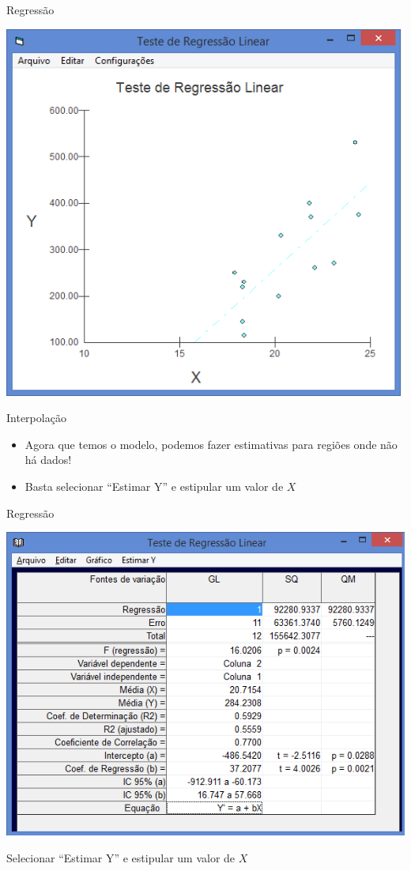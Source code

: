 \documentclass{beamer}
\begin{document}
\begin{frame}{Regressão}
  \begin{center}
    \includegraphics[height=0.9\textheight]{grafico_regressao}
  \end{center}
\end{frame}

\begin{frame}{Interpolação}
  \begin{itemize}
  \item Agora que temos o modelo, podemos fazer estimativas
    para regiões onde não há dados!
  \item Basta selecionar ``Estimar Y'' e estipular um valor de $X$
  \end{itemize}
\end{frame}

\begin{frame}{Regressão}
  \begin{center}
    \includegraphics[height=0.7\textheight]{resultado_regressao}
  \end{center}

Selecionar ``Estimar Y'' e estipular um valor de $X$
\end{frame}
\end{document}
